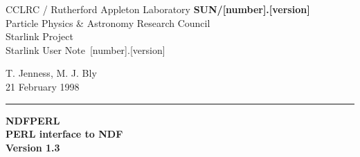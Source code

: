 \documentclass[twoside,11pt]{article}
\newcommand{\stardoccategory}  {Starlink User Note}
\newcommand{\stardocinitials}  {SUN}
\newcommand{\stardocnumber}    {[number].[version]}
\newcommand{\stardocauthors}   {T. Jenness, M. J. Bly}
\newcommand{\stardocdate}      {21 February 1998}
\newcommand{\stardoctitle}     {NDFPERL \\ [2ex] PERL interface to NDF}
\newcommand{\stardocversion}   {Version 1.3}
\newcommand{\stardocmanual}    {}
\newcommand{\stardocname}{\stardocinitials /\stardocnumber}
\newenvironment{latexonly}{}{}
\begin{document}
\thispagestyle{empty}

\begin{latexonly}
   CCLRC / {\sc Rutherford Appleton Laboratory} \hfill {\bf \stardocname}\\
   {\large Particle Physics \& Astronomy Research Council}\\
   {\large Starlink Project\\}
   {\large \stardoccategory\ \stardocnumber}
   \begin{flushright}
   \stardocauthors\\
   \stardocdate
   \end{flushright}
   \vspace{-4mm}
   \rule{\textwidth}{0.5mm}
   \vspace{5mm}
   \begin{center}
   {\Huge\bf  \stardoctitle \\ [2.5ex]}
   {\LARGE\bf \stardocversion \\ [4ex]}
   \end{center}
   \vspace{5mm}


\end{latexonly}
\end{document}
